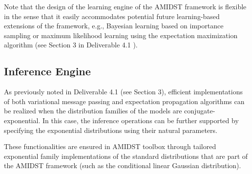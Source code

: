 Note that the design of the learning engine of the AMIDST framework is flexible in the sense that it easily accommodates potential future learning-based extensions of the framework, e.g., Bayesian learning based on importance sampling or maximum likelihood learning using the expectation maximization algorithm (see Section 3 in Deliverable 4.1 \cite{Deliverable4.1}). 
 
\subsection{Inference Engine}

As previously noted in Deliverable 4.1 \cite{Deliverable4.1} (see Section 3), efficient implementations of both variational message passing and expectation propagation algorithms can be realized when the distribution families of the models are conjugate-exponential. In this case, the inference operations can be further supported by specifying the exponential distributions using their natural parameters. 

These functionalities are ensured in AMIDST toolbox through tailored exponential family implementations of the standard distributions that are part of the AMIDST framework (such as the conditional linear Gaussian distribution). 


  